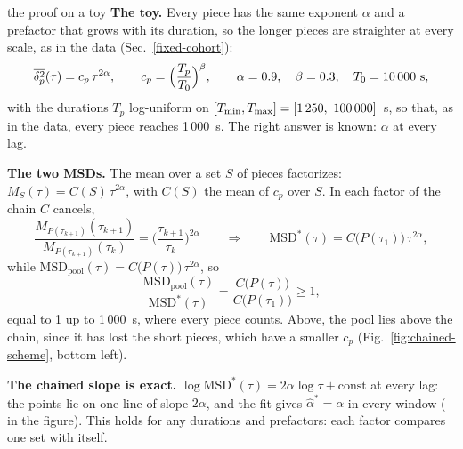 \documentclass[10pt,a4paper]{article}
\begin{document}
\begin{method}{the proof on a toy}
  \textbf{The toy.} Every piece has the same exponent $\alpha$ and a prefactor that grows with its duration,
  so the longer pieces are straighter at every scale, as in the data (Sec.~\ref{fixed-cohort}):
  \[ \overline{\delta^2_p}(\tau)=c_p\,\tau^{2\alpha},\qquad c_p=\Big(\frac{T_p}{T_0}\Big)^{\beta},\qquad
     \alpha=0.9,\quad \beta=0.3,\quad T_0=10\,000~\mathrm{s}, \]
  with the durations $T_p$ log-uniform on $[T_\mathrm{min},T_\mathrm{max}]=[\PieceMinS,\ \ToyPlTmax]$~s, so
  that, as in the data, every piece reaches 1\,000~s. The right answer is known: $\alpha$ at every lag.

  \textbf{The two MSDs.} The mean over a set $S$ of pieces factorizes: $M_S(\tau)=C(S)\,\tau^{2\alpha}$,
  with $C(S)$ the mean of $c_p$ over $S$. In each factor of the chain $C$ cancels,
  \[ \frac{M_{P(\tau_{k+1})}(\tau_{k+1})}{M_{P(\tau_{k+1})}(\tau_k)}=\Big(\frac{\tau_{k+1}}{\tau_k}\Big)^{2\alpha}
     \qquad\Longrightarrow\qquad \mathrm{MSD}^*(\tau)=C\big(P(\tau_1)\big)\,\tau^{2\alpha}, \]
  while $\mathrm{MSD}_\mathrm{pool}(\tau)=C\big(P(\tau)\big)\,\tau^{2\alpha}$, so
  \[ \frac{\mathrm{MSD}_\mathrm{pool}(\tau)}{\mathrm{MSD}^*(\tau)}=\frac{C\big(P(\tau)\big)}{C\big(P(\tau_1)\big)}\ge1, \]
  equal to 1 up to 1\,000~s, where every piece counts. Above, the pool lies above the chain, since it has lost
  the short pieces, which have a smaller $c_p$ (Fig.~\ref{fig:chained-scheme}, bottom left).

  \textbf{The chained slope is exact.} $\log\mathrm{MSD}^*(\tau)=2\alpha\log\tau+\text{const}$ at every lag: the
  points lie on one line of slope $2\alpha$, and the fit gives $\hat\alpha^*=\alpha$ in every window
  (\ToyPlChained{} in the figure). This holds for any durations and prefactors: each factor compares one set with
  itself.


\end{method}
\end{document}

